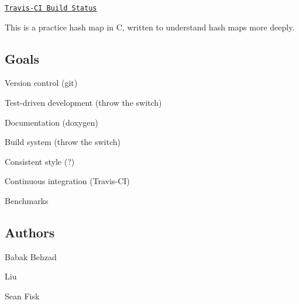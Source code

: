  \href{https://travis-ci.org/seanfisk/c-hash-map}{\tt Travis-\/\-C\-I Build Status}

This is a practice hash map in C, written to understand hash maps more deeply.

\subsection*{Goals}


\begin{DoxyItemize}
\item Version control (git)
\item Test-\/driven development (throw the switch)
\item Documentation (doxygen)
\item Build system (throw the switch)
\item Consistent style (?)
\item Continuous integration (Travis-\/\-C\-I)
\item Benchmarks
\end{DoxyItemize}

\subsection*{Authors}


\begin{DoxyItemize}
\item Babak Behzad
\item Liu
\item Sean Fisk 
\end{DoxyItemize}